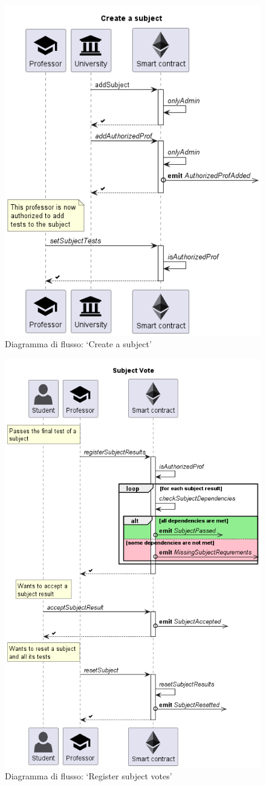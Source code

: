 \begin{figure}
    \centering
    \includegraphics[width=0.70\columnwidth]{img/CreateSubject.png}
    \caption{Diagramma di flusso: `Create a subject'}
    \label{fig:create_subject}
\end{figure}

\begin{figure}
    \centering
    \includegraphics[width=0.85\columnwidth]{img/SubjectVote.png}
    \caption{Diagramma di flusso: `Register subject votes'}
    \label{fig:registerSubjectVotes}
\end{figure}

